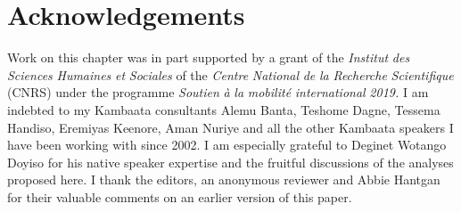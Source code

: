 \documentclass[output=paper]{langscibook}
\begin{document}
\section*{Acknowledgements}

Work on this chapter was in part supported by a grant of the \textit{Institut} \textit{des} \textit{Sciences} \textit{Humaines} \textit{et} \textit{Sociales} of the \textit{Centre} \textit{National} \textit{de} \textit{la} \textit{Recherche} \textit{Scientifique} (CNRS) under the programme \textit{Soutien} \textit{à} \textit{la} \textit{mobilité} \textit{international} \textit{2019.} I am indebted to my Kambaata consultants Alemu Banta, Teshome Dagne, Tessema Handiso, Eremiyas Keenore, Aman Nuriye and all the other Kambaata speakers I have been working with since 2002. I am especially grateful to Deginet Wotango Doyiso for his native speaker expertise and the fruitful discussions of the analyses proposed here. I thank the editors, an anonymous reviewer and Abbie Hantgan for their valuable comments on an earlier version of this paper.

\end{document}
